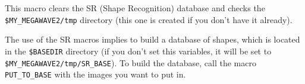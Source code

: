 This macro clears the SR (Shape Recognition) database and checks
the \verb+$MY_MEGAWAVE2/tmp+ directory (this one is created if you
don't have it already). 

The use of the SR macros implies to build a database of shapes, which
is located in the \verb+$BASEDIR+ directory (if you don't set this
variables, it will be set to \verb+$MY_MEGAWAVE2/tmp/SR_BASE+).
To build the database, call the macro \verb+PUT_TO_BASE+ with the
images you want to put in.

